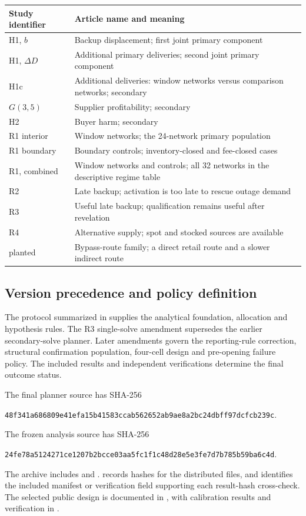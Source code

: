 \documentclass[preprint,11pt,authoryear]{elsarticle}
\begin{document}
\begin{center}\small
\begin{tabular}{p{3cm}p{10cm}}\toprule
Study identifier & Article name and meaning\\\midrule
H1, $b$ & Backup displacement; first joint primary component\\
H1, $\Delta D$ & Additional primary deliveries; second joint primary component\\
H1c & Additional deliveries: window networks versus comparison networks; secondary\\
$G(3,5)$ & Supplier profitability; secondary\\
H2 & Buyer harm; secondary\\\midrule
R1 interior & Window networks; the 24-network primary population\\
R1 boundary & Boundary controls; inventory-closed and fee-closed cases\\
R1, combined & Window networks and controls; all 32 networks in the descriptive regime table\\
R2 & Late backup; activation is too late to rescue outage demand\\
R3 & Useful late backup; qualification remains useful after revelation\\
R4 & Alternative supply; spot and stocked sources are available\\
planted & Bypass-route family; a direct retail route and a slower indirect route\\
\bottomrule\end{tabular}
\end{center}

\subsection{Version precedence and policy definition}
The protocol summarized in  supplies the analytical foundation, allocation and hypothesis rules. The R3 single-solve amendment supersedes the earlier secondary-solve planner. Later amendments govern the reporting-rule correction, structural confirmation population, four-cell design and pre-opening failure policy. The included results and independent verifications determine the final outcome status.

The final planner source has SHA-256
\begin{center}\footnotesize\texttt{48f341a686809e41efa15b41583ccab562652ab9ae8a2bc24dbff97dcfcb239c}.\end{center}
The frozen analysis source has SHA-256
\begin{center}\footnotesize\texttt{24fe78a5124271ce1207b2bcce03aa5fc1f1c48d28e5e3fe7d7b785b59ba6c4d}.\end{center}
The archive includes  and .  records hashes for the distributed files, and  identifies the included manifest or verification field supporting each result-hash cross-check. The selected public design is documented in , with calibration results and verification in .
\end{document}
